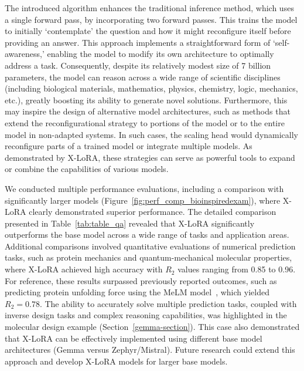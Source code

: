 The introduced algorithm enhances the traditional inference method, which uses a single forward pass, by incorporating two forward passes. This trains the model to initially `contemplate' the question and how it might reconfigure itself before providing an answer. This approach implements a straightforward form of `self-awareness,’ enabling the model to modify its own architecture to optimally address a task. Consequently, despite its relatively modest size of 7 billion parameters, the model can reason across a wide range of scientific disciplines (including biological materials, mathematics, physics, chemistry, logic, mechanics, etc.), greatly boosting its ability to generate novel solutions. Furthermore, this may inspire the design of alternative model architectures, such as methods that extend the reconfigurational strategy to portions of the model or to the entire model in non-adapted systems. In such cases, the scaling head would dynamically reconfigure parts of a trained model or integrate multiple models. As demonstrated by X-LoRA, these strategies can serve as powerful tools to expand or combine the capabilities of various models.

We conducted multiple performance evaluations, including a comparison with significantly larger models (Figure~\ref{fig:perf_comp_bioinspiredexam}), where X-LoRA clearly demonstrated superior performance. The detailed comparison presented in Table~\ref{tab:table_qa} revealed that X-LoRA significantly outperforms the base model across a wide range of tasks and application areas. Additional comparisons involved quantitative evaluations of numerical prediction tasks, such as protein mechanics and quantum-mechanical molecular properties, where X-LoRA achieved high accuracy with $R_2$ values ranging from 0.85 to 0.96. For reference, these results surpassed previously reported outcomes, such as predicting protein unfolding force using the MeLM model~\cite{Buehler2023MeLMProblemsb}, which yielded $R_2=0.78$. The ability to accurately solve multiple prediction tasks, coupled with inverse design tasks and complex reasoning capabilities, was highlighted in the molecular design example (Section~\ref{gemma-section}). This case also demonstrated that X-LoRA can be effectively implemented using different base model architectures (Gemma versus Zephyr/Mistral). Future research could extend this approach and develop X-LoRA models for larger base models.


